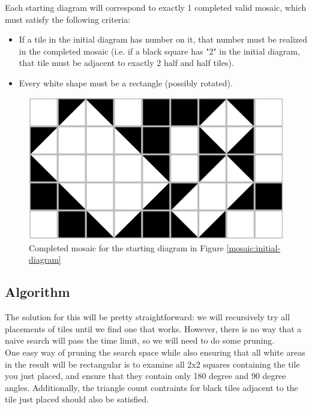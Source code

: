 Each starting diagram will correspond to exactly 1 completed valid mosaic, which
must satisfy the following criteria:

\begin{itemize}
  \item If a tile in the initial diagram has number on it, that number must
  be realized in the completed mosaic (i.e. if a black square has "2" in the
  initial diagram, that tile must be adjacent to exactly 2 half and half tiles).
  \item Every white shape must be a rectangle (possibly rotated).
\end{itemize}

\begin{figure}[h!]
  \centering
  \includegraphics{Images/mosaic-final.png}
  \caption{Completed mosaic for the starting diagram in Figure \ref{mosaic:initial-diagram}}
  \label{mosaic:completed-example}
\end{figure}

\subsection{Algorithm}

The solution for this will be pretty straightforward: we will recursively try
all placements of tiles until we find one that works. However, there is no way
that a naive search will pass the time limit, so we will need to do some pruning. \\

One easy way of pruning the search space while also ensuring that all white areas
in the result will be rectangular is to examine all 2x2 squares containing the
tile you just placed, and ensure that they contain only 180 degree and 90 degree
angles. Additionally, the triangle count contraints for black tiles adjacent to
the tile just placed should also be satisfied.\\


